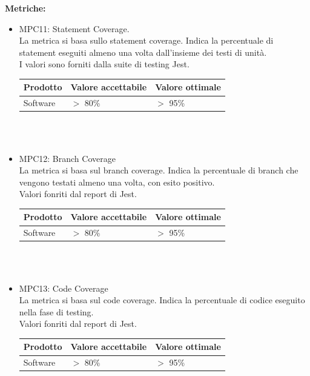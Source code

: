 \documentclass[12pt]{article}
\begin{document}
\textbf{Metriche:}
\begin{itemize}
\item MPC11: Statement Coverage. \\
La metrica si basa sullo statement coverage.
Indica la percentuale di statement eseguiti almeno una volta dall'insieme dei testi di unità.\\
 I valori sono forniti dalla suite di testing Jest.

\begin{center}
	\begin{tabularx}{\textwidth}{|X|X|X|}
		\hline
		\textbf{Prodotto} & \textbf{Valore accettabile } & \textbf{Valore ottimale } \\
		\hline
		Software          & $>$ 80\%                     & $>$ 95\%                     \\
		\hline
	\end{tabularx}\\[8pt]
	\mbox{}\\
\end{center}

\item MPC12: Branch Coverage \\
La metrica si basa sul branch coverage. Indica la percentuale di branch che vengono testati almeno una volta, con esito positivo. \\
Valori fonriti dal report di Jest.

\begin{center}
	\begin{tabularx}{\textwidth}{|X|X|X|}
		\hline
		\textbf{Prodotto} & \textbf{Valore accettabile } & \textbf{Valore ottimale } \\
		\hline
		Software          & $>$ 80\%                     & $>$ 95\%                     \\
		\hline
	\end{tabularx}\\[8pt]
	\mbox{}\\
\end{center}

\item MPC13: Code Coverage \\
La metrica si basa sul code coverage. Indica la percentuale di codice eseguito nella fase di testing. \\
Valori fonriti dal report di Jest.

\begin{center}
	\begin{tabularx}{\textwidth}{|X|X|X|}
		\hline
		\textbf{Prodotto} & \textbf{Valore accettabile } & \textbf{Valore ottimale } \\
		\hline
		Software          & $>$ 80\%                     & $>$ 95\%                     \\
		\hline
	\end{tabularx}\\[8pt]
	\mbox{}\\
\end{center}


\end{itemize}
\end{document}
